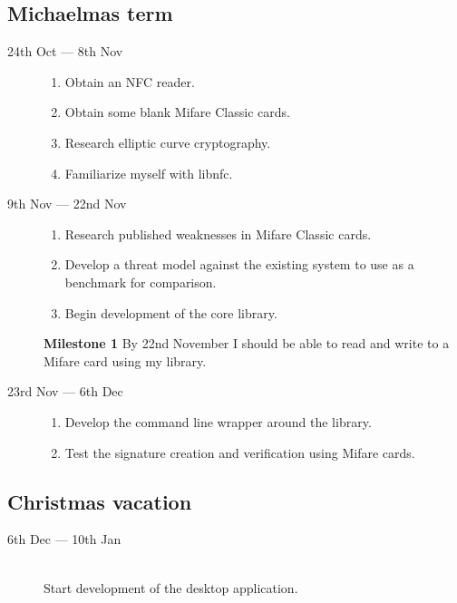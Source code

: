 \documentclass[a4paper, 12pt]{article}
\begin{document}
  \subsection*{Michaelmas term}
  \begin{description}
    \item[24th Oct --- 8th Nov] \hfill
      \begin{enumerate}
        \item Obtain an NFC reader.
        \item Obtain some blank Mifare Classic cards.
        \item Research elliptic curve cryptography.
        \item Familiarize myself with libnfc.
      \end{enumerate}

    \item[9th Nov --- 22nd Nov] \hfill
      \begin{enumerate}
        \item Research published weaknesses in Mifare Classic cards.
        \item Develop a threat model against the existing system to use as a
          benchmark for comparison.
        \item Begin development of the core library.
      \end{enumerate}

      \textbf{Milestone 1}
      By 22nd November I should be able to read and write to a Mifare card using
      my library.

    \item[23rd Nov --- 6th Dec] \hfill
      \begin{enumerate}
        \item Develop the command line wrapper around the library.
        \item Test the signature creation and verification using Mifare cards.
      \end{enumerate}
  \end{description}

  \subsection*{Christmas vacation}
  \begin{description}
    \item[6th Dec --- 10th Jan] \hfill \\
      Start development of the desktop application.
  \end{description}
\end{document}
